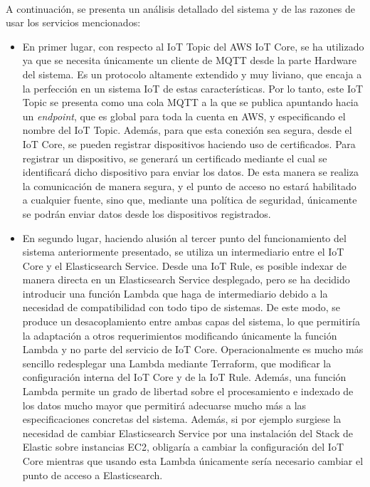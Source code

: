 \documentclass[../../memoria.tex]{subfiles}
\begin{document}
\paragraph{}
A continuación, se presenta un análisis detallado del sistema y de las razones de usar los servicios mencionados:

\begin{itemize}
    \item En primer lugar, con respecto al IoT Topic del AWS IoT Core, se ha utilizado ya que se necesita únicamente un cliente de MQTT desde la parte Hardware del sistema. Es un protocolo altamente extendido y muy liviano, que encaja a la perfección en un sistema IoT de estas características. Por lo tanto, este IoT Topic se presenta como una cola MQTT a la que se publica apuntando hacia un \textit{endpoint}, que es global para toda la cuenta en AWS, y especificando el nombre del IoT Topic. Además, para que esta conexión sea segura, desde el IoT Core, se pueden registrar dispositivos haciendo uso de certificados. Para registrar un dispositivo, se generará un certificado mediante el cual se identificará dicho dispositivo para enviar los datos. De esta manera se realiza la comunicación de manera segura, y el punto de acceso no estará habilitado a cualquier fuente, sino que, mediante una política de seguridad, únicamente se podrán enviar datos desde los dispositivos registrados.

    \item En segundo lugar, haciendo alusión al tercer punto del funcionamiento del sistema anteriormente presentado, se utiliza un intermediario entre el IoT Core y el Elasticsearch Service. Desde una IoT Rule, es posible indexar de manera directa en un Elasticsearch Service desplegado, pero se ha decidido introducir una función Lambda que haga de intermediario debido a la necesidad de compatibilidad con todo tipo de sistemas. De este modo, se produce un desacoplamiento entre ambas capas del sistema, lo que permitiría la adaptación a otros requerimientos modificando únicamente la función Lambda y no parte del servicio de IoT Core. Operacionalmente es mucho más sencillo redesplegar una Lambda mediante Terraform, que modificar la configuración interna del IoT Core y de la IoT Rule. Además, una función Lambda permite un grado de libertad sobre el procesamiento e indexado de los datos mucho mayor que permitirá adecuarse mucho más a las especificaciones concretas del sistema. Además, si por ejemplo surgiese la necesidad de cambiar Elasticsearch Service por una instalación del Stack de Elastic sobre instancias EC2, obligaría a cambiar la configuración del IoT Core mientras que usando esta Lambda únicamente sería necesario cambiar el punto de acceso a Elasticsearch.


\end{itemize}
\end{document}
